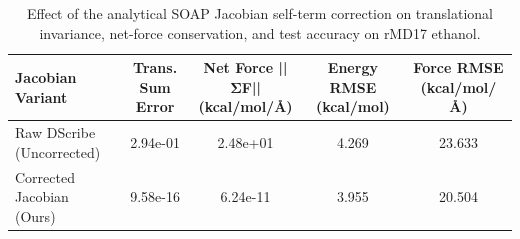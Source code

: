 \begin{table}[htbp]
\centering
\caption{Effect of the analytical SOAP Jacobian self-term correction on translational invariance, net-force conservation, and test accuracy on rMD17 ethanol.}
\label{tab:self_term_ablation}
\begin{tabular}{lcccc}
\toprule
Jacobian Variant & Trans. Sum Error & Net Force ||ΣF|| (kcal/mol/Å) & Energy RMSE (kcal/mol) & Force RMSE (kcal/mol/Å) \\
\midrule
Raw DScribe (Uncorrected) & 2.94e-01 & 2.48e+01 & 4.269 & 23.633 \\
Corrected Jacobian (Ours) & 9.58e-16 & 6.24e-11 & 3.955 & 20.504 \\
\bottomrule
\end{tabular}
\end{table}
